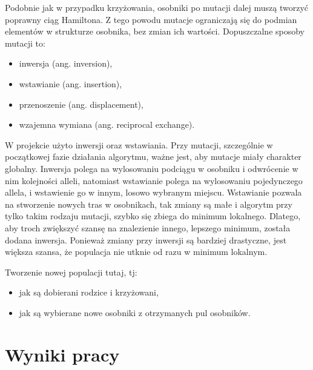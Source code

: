 \documentclass{article}
\begin{document}
Podobnie jak w przypadku krzyżowania, osobniki po mutacji dalej muszą tworzyć
poprawny ciąg Hamiltona. Z tego powodu mutacje ograniczają się do podmian
elementów w strukturze osobnika, bez zmian ich wartości. Dopuszczalne sposoby
mutacji to:
\begin{itemize}
    \item inwersja (ang. inversion),
    \item wstawianie (ang. insertion),
    \item przenoszenie (ang. displacement),
    \item wzajemna wymiana (ang. reciprocal exchange).
\end{itemize}
W projekcie użyto inwersji oraz wstawiania. Przy mutacji, szczególnie w
początkowej fazie działania algorytmu, ważne jest, aby mutacje miały charakter
globalny. Inwersja polega na wylosowaniu podciągu w osobniku i odwrócenie w nim
kolejności alleli, natomiast wstawianie polega na wylosowaniu pojedynczego
allela, i wstawienie go w innym, losowo wybranym miejscu. Wstawianie pozwala na
stworzenie nowych tras w osobnikach, tak zmiany są małe i algorytm przy tylko
takim rodzaju mutacji, szybko się zbiega do minimum lokalnego. Dlatego, aby
troch zwiększyć szansę na znalezienie innego, lepszego minimum, została dodana
inwersja. Ponieważ zmiany przy inwersji są bardziej drastyczne, jest większa
szansa, że populacja nie utknie od razu w minimum lokalnym.

Tworzenie nowej populacji tutaj, tj:
\begin{itemize}
    \item jak są dobierani rodzice i krzyżowani,
    \item jak są wybierane nowe osobniki z otrzymanych pul osobników.
\end{itemize}

\section{Wyniki pracy}
\end{document}

